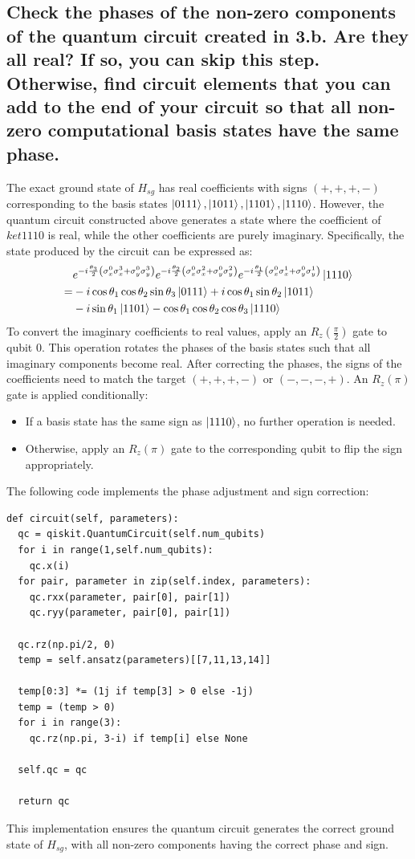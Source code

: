 \documentclass[a4paper, 11pt]{article}
\begin{document}
\subsection*{Check the phases of the non-zero components of the quantum circuit created in 3.b. Are they all real? If so, you can skip this step. Otherwise, find circuit elements that you can add to the end of your circuit so that all non-zero computational basis states have the same phase.}
The exact ground state of $H_{sg}$ has real coefficients with signs $(+,+,+,-)$ corresponding to the basis states $\ket{0111}, \ket{1011},\ket{1101},\ket{1110}$.
However, the quantum circuit constructed above generates a state where the coefficient of $ket{1110}$ is real, while the other coefficients are purely imaginary. Specifically, the state produced by the circuit can be expressed as: 
\begin{align*}
  &
  e^{-i\frac{\theta_{3}}{2} \left( \sigma_x^{0}\sigma_x^{3} + \sigma_y^{0}\sigma_y^{3}\right)}
  e^{-i\frac{\theta_{2}}{2} \left( \sigma_x^{0}\sigma_x^{2} + \sigma_y^{0}\sigma_y^{2}\right)}
  e^{-i\frac{\theta_{1}}{2} \left( \sigma_x^{0}\sigma_x^{1} + \sigma_y^{0}\sigma_y^{1}\right)}
  \ket{1110} \\
  =& -i\cos\theta_{1}\cos\theta_{2}\sin\theta_{3}\ket{0111} +i\cos\theta_{1}\sin\theta_{2}\ket{1011}\\
  &-i\sin\theta_{1} \ket{1101} - \cos\theta_{1}\cos\theta_{2}\cos\theta_{3}\ket{1110}
\end{align*}
To convert the imaginary coefficients to real values, apply an $R_{z}\left(\frac{\pi}{2}\right)$ gate to qubit 0.
This operation rotates the phases of the basis states such that all imaginary components become real.
After correcting the phases, the signs of the coefficients need to match the target  $(+,+,+,-)$ or  $(-,-,-,+)$. 
An $R_z (\pi)$ gate is applied conditionally:
\begin{itemize}
  \item If a basis state has the same sign as $\ket{1110}$, no further operation is needed.
  \item Otherwise, apply an $R_z (\pi)$ gate to the corresponding qubit to flip the sign appropriately.
\end{itemize}
The following code implements the phase adjustment and sign correction:
\begin{verbatim}
def circuit(self, parameters):
  qc = qiskit.QuantumCircuit(self.num_qubits)
  for i in range(1,self.num_qubits):
    qc.x(i)
  for pair, parameter in zip(self.index, parameters):
    qc.rxx(parameter, pair[0], pair[1])
    qc.ryy(parameter, pair[0], pair[1])

  qc.rz(np.pi/2, 0)
  temp = self.ansatz(parameters)[[7,11,13,14]]

  temp[0:3] *= (1j if temp[3] > 0 else -1j)
  temp = (temp > 0)
  for i in range(3):
    qc.rz(np.pi, 3-i) if temp[i] else None

  self.qc = qc

  return qc
\end{verbatim}
This implementation ensures the quantum circuit generates the correct ground state of $H_{sg}$,
with all non-zero components having the correct phase and sign. 
\end{document}
